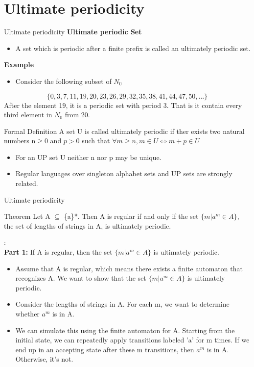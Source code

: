 \documentclass{beamer}
\begin{document}
\section{Ultimate periodicity}
\begin{frame}{Ultimate periodicity}
\textbf{Ultimate periodic Set}
\begin{itemize}
	\item A set which is periodic after a finite prefix is called an ultimately periodic set.
\end{itemize}
\textbf{Example}
\begin{itemize}
	\item Consider the following subset of $N_0$
\end{itemize}
	$$\{0,3,7,11,19,20,23,26,29,32,35,38,41,44,47,50,...\}$$
After the element 19, it is a periodic set with period 3. That is it contain every third element in $N_0$ from 20. 
\begin{block}{Formal Definition}
	A set U is called ultimately periodic if ther exists two natural numbers n$\geq$0 and $p>0$ such that $\forall m \geq n, m\in U\iff m + p\in U$
\end{block}
\begin{itemize}
	\item For an UP set U neither n nor p may be unique.
	\item Regular languages over singleton alphabet sets and UP sets are strongly related.
\end{itemize}
\end{frame}
\begin{frame}{Ultimate periodicity}
	\small
\begin{block}{Theorem}
Let A $\subseteq$ \{a\}*. Then A is regular if and only if the set $\{m |a^m \in A\}$, the 
set of lengths of strings in A, is ultimately periodic. 
\end{block}
\proofname :\\
\textbf{Part 1:} If A is regular, then the set $ \{m | a^m \in A\}$ is ultimately periodic.
\begin{itemize}
	\item Assume that A is regular, which means there exists a finite automaton that recognizes A. We want to show that the set $\{m | a^m \in A\}$ is ultimately periodic.
	\item Consider the lengths of strings in A. For each m, we want to determine whether $a^m$ is in A.
	\item We can simulate this using the finite automaton for A. Starting from the initial state, we can repeatedly apply transitions labeled 'a' for m times. If we end up in an accepting state after these m transitions, then $a^m$ is in A. Otherwise, it's not.
\end{itemize}
\end{frame}
\end{document}
